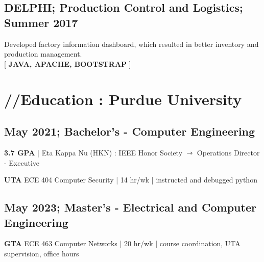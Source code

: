 \documentclass[10pt, letterpaper]{article}
\newcommand{\emphasis}[1]{
    \textcolor{purduegold}{\textbf{#1}}
}
\newcommand{\Emphasis}[1]{\uppercase{\textbf{#1}}}
\newcommand{\EMPHASIS}[1]{
    \uppercase{\emphasis{#1}}
}
\begin{document}
    \subsection*{\Emphasis{Delphi}; \emphasis{Production Control and Logistics;} Summer 2017}
        \begin{enumerate}[label={[\arabic*]}]
            \setcounter{enumi}{-1}
            \item Developed factory information dashboard, which resulted in better inventory and production management.\\ {[{\scriptsize \EMPHASIS{Java, Apache, Bootstrap}}]}
        \end{enumerate}
\section*{\huge{//Education :\emphasis{Purdue University}}}
    \subsection*{May 2021; Bachelor's - Computer Engineering}
        \begin{enumerate}[label={[\arabic*]}]
            \setcounter{enumi}{-1}
            \item \emphasis{3.7 GPA} | Eta Kappa Nu (HKN) : IEEE Honor Society $\rightarrowtriangle$ Operations Director - Executive
            \item \emphasis{UTA} ECE 404 Computer Security | 14 hr/wk | instructed and debugged python
        \end{enumerate}
    \subsection*{May 2023; Master's - Electrical and Computer Engineering}
        \begin{enumerate}[label={[\arabic*]}]
            \setcounter{enumi}{-1}
            \item \emphasis{GTA} ECE 463 Computer Networks | 20 hr/wk | course coordination, UTA supervision, office hours
        \end{enumerate}
\end{document}
